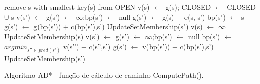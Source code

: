 \newpage
\begin{algorithm}[H]
\SetAlgoLined
{
	remove s with smallest key(s) from OPEN\;
	{
		v(s) $\leftarrow$ g(s); CLOSED $\leftarrow$ CLOSED $\cup$ {s}\;
		{
			{
				v(s') $\leftarrow$ g(s') $\leftarrow$ $\infty$;bp(s') $\leftarrow$ null\;
			}
			{
				g(s') $\leftarrow$ g(s) + c(s, s')\;
				bp(s') $\leftarrow$ s\;
				g(s') $\leftarrow$ g(bp(s')) + c(bp(s'),s')\; UpdateSetMembership(s')\;
			}
		}
	}
	{
		v(s) $\leftarrow$ $\infty$\; UpdateSetMembership(s)\;	
		{
			{
				v(s') $\leftarrow$ g(s') $\leftarrow$ $\infty$;bp(s') $\leftarrow$ null\;
			}
			{
				bp(s') $\leftarrow$ $argmin_{s'' \in pred(s')}$ v(s'') + c(s'',s')\;
				g(s') $\leftarrow$ v(bp(s')) + c(bp(s'),s')\; UpdateSetMembership(s')\;
			}
		}
	}
}
\caption{Algoritmo AD* - função de cálculo de caminho ComputePath().}
\end{algorithm}


